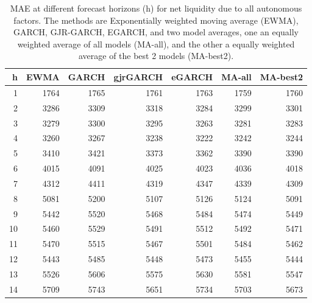 \documentclass{article}
\begin{document}
\begin{table}[ht]
\centering
\begin{tabular}{rrrrrrr}
  \hline
h & EWMA & GARCH & gjrGARCH & eGARCH & MA-all & MA-best2 \\ 
  \hline
1 & 1764 & 1765 & 1761 & 1763 & 1759 & 1760 \\ 
  2 & 3286 & 3309 & 3318 & 3284 & 3299 & 3301 \\ 
  3 & 3279 & 3300 & 3295 & 3263 & 3281 & 3283 \\ 
  4 & 3260 & 3267 & 3238 & 3222 & 3242 & 3244 \\ 
  5 & 3410 & 3421 & 3373 & 3362 & 3390 & 3390 \\ 
  6 & 4015 & 4091 & 4025 & 4023 & 4036 & 4018 \\ 
  7 & 4312 & 4411 & 4319 & 4347 & 4339 & 4309 \\ 
  8 & 5081 & 5200 & 5107 & 5126 & 5124 & 5091 \\ 
  9 & 5442 & 5520 & 5468 & 5484 & 5474 & 5449 \\ 
  10 & 5460 & 5529 & 5491 & 5512 & 5492 & 5471 \\ 
  11 & 5470 & 5515 & 5467 & 5501 & 5484 & 5462 \\ 
  12 & 5443 & 5485 & 5448 & 5473 & 5455 & 5444 \\ 
  13 & 5526 & 5606 & 5575 & 5630 & 5581 & 5547 \\ 
  14 & 5709 & 5743 & 5651 & 5734 & 5703 & 5673 \\ 
   \hline
\end{tabular}
\caption{MAE at different forecast horizons (h) for net liquidity due to all autonomous factors. The methods are Exponentially weighted moving average (EWMA), GARCH, GJR-GARCH, EGARCH, and two model averages, one an equally weighted average of all models (MA-all), and the other a equally weighted average of the best 2 models (MA-best2).} 
\label{tab:maeagg}
\end{table}
\end{document}
